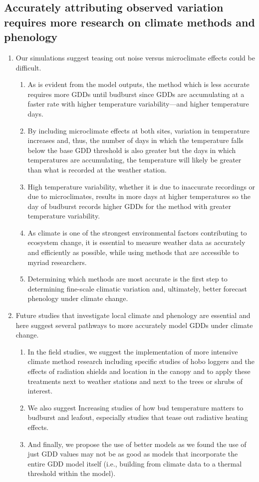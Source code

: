 \documentclass{article}\usepackage[]{graphicx}\usepackage[]{color}
\begin{document}
\subsection*{Accurately attributing observed variation requires more research on climate methods and phenology} 
  \begin{enumerate} 
\item Our simulations suggest teasing out noise versus microclimate effects could be difficult.
  \begin{enumerate} 
  \item As is evident from the model outputs, the method which is less accurate requires more GDDs until budburst since GDDs are accumulating at a faster rate with higher temperature variability---and higher temperature days.
  \item By including microclimate effects at both sites, variation in temperature increases and, thus, the number of days in which the temperature falls below the base GDD threshold is also greater but the days in which temperatures are accumulating, the temperature will likely be greater than what is recorded at the weather station.
  \item High temperature variability, whether it is due to inaccurate recordings or due to microclimates, results in more days at higher temperatures so the day of budburst records higher GDDs for the method with greater temperature variability. 
  \item As climate is one of the strongest environmental factors contributing to ecosystem change, it is essential to measure weather data as accurately and efficiently as possible, while using methods that are accessible to myriad researchers.
  \item Determining which methods are most accurate is the first step to determining fine-scale climatic variation and, ultimately, better forecast phenology under climate change. 
  \end{enumerate}
  
\item Future studies that investigate local climate and phenology are essential and here suggest several pathways to more accurately model GDDs under climate change.
    \begin{enumerate} 
    \item In the field studies, we suggest the implementation of more intensive climate method research including specific studies of hobo loggers and the effects of radiation shields and location in the canopy and to apply these treatments next to weather stations and next to the trees or shrubs of interest. 
    \item We also suggest Increasing studies of how bud temperature matters to budburst and leafout, especially studies that tease out radiative heating effects.
    \item And finally, we propose the use of better models as we found the use of just GDD values may not be as good as models that incorporate the entire GDD model itself (i.e., building from climate data to a thermal threshold within the model).
  \end{enumerate}
  

\end{enumerate}
\end{document}
